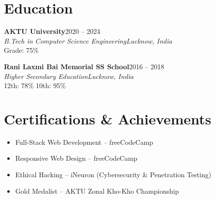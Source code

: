 \documentclass[letterpaper,10pt]{article}
\begin{document}
\section{Education}
\noindent\textbf{AKTU University}\hfill\textcolor{secondary}{2020 -- 2024}\\
{\itshape\color{secondary}B.Tech in Computer Science Engineering}\hfill\textcolor{secondary}{\itshape Lucknow, India} \\ {\color{secondary}Grade: 75\%}
\vspace{2pt}

\noindent\textbf{Rani Laxmi Bai Memorial SS School}\hfill\textcolor{secondary}{2016 -- 2018}\\
{\itshape\color{secondary}Higher Secondary Education}\hfill\textcolor{secondary}{\itshape Lucknow, India} \\ {\color{secondary}12th: 78\% \textperiodcentered{} 10th: 95\%}

\section{Certifications \& Achievements}
\begin{itemize}
  \item Full-Stack Web Development -- freeCodeCamp
  \item Responsive Web Design -- freeCodeCamp
  \item Ethical Hacking -- iNeuron (Cybersecurity \& Penetration Testing)
  \item Gold Medalist -- AKTU Zonal Kho-Kho Championship
\end{itemize}
\end{document}

